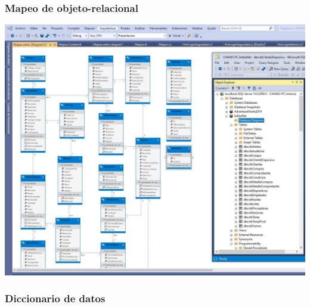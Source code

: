 \documentclass[12pt,letterpaper]{article}
\begin{document}
\subsubsection{Mapeo de objeto-relacional}
\begin{center}
	\includegraphics[width=15cm]{./img/image17.jpg} 
\end{center}


\subsubsection{Diccionario de datos}
\end{document}
